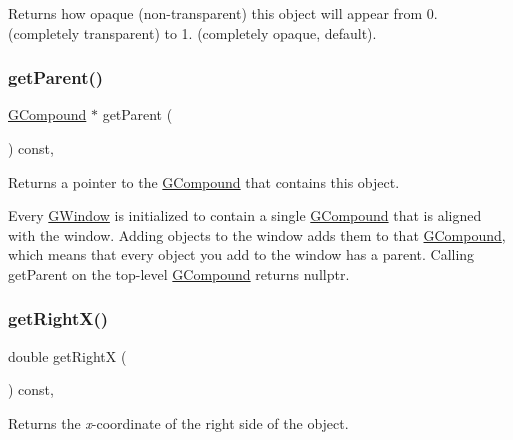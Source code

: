 Returns how opaque (non-\/transparent) this object will appear from 0. (completely transparent) to 1. (completely opaque, default). 

\mbox{\label{classGObject_a3e53cef70541b1a14eade4ad0984d0b4}} 
\subsubsection{\texorpdfstring{get\+Parent()}{getParent()}}
{\footnotesize\ttfamily \mbox{\hyperlink{classGCompound}{G\+Compound}} $\ast$ get\+Parent (\begin{DoxyParamCaption}{ }\end{DoxyParamCaption}) const\hspace{0.3cm}{\ttfamily [virtual]}, {\ttfamily [inherited]}}



Returns a pointer to the {\ttfamily \mbox{\hyperlink{classGCompound}{G\+Compound}}} that contains this object. 

Every {\ttfamily \mbox{\hyperlink{classGWindow}{G\+Window}}} is initialized to contain a single {\ttfamily \mbox{\hyperlink{classGCompound}{G\+Compound}}} that is aligned with the window. Adding objects to the window adds them to that {\ttfamily \mbox{\hyperlink{classGCompound}{G\+Compound}}}, which means that every object you add to the window has a parent. Calling {\ttfamily get\+Parent} on the top-\/level {\ttfamily \mbox{\hyperlink{classGCompound}{G\+Compound}}} returns {\ttfamily nullptr}. \mbox{\label{classGObject_a798cc79daaa10145b28f60bcdfdb0ee9}} 
\subsubsection{\texorpdfstring{get\+Right\+X()}{getRightX()}}
{\footnotesize\ttfamily double get\+RightX (\begin{DoxyParamCaption}{ }\end{DoxyParamCaption}) const\hspace{0.3cm}{\ttfamily [virtual]}, {\ttfamily [inherited]}}



Returns the {\itshape x}-\/coordinate of the right side of the object. 

